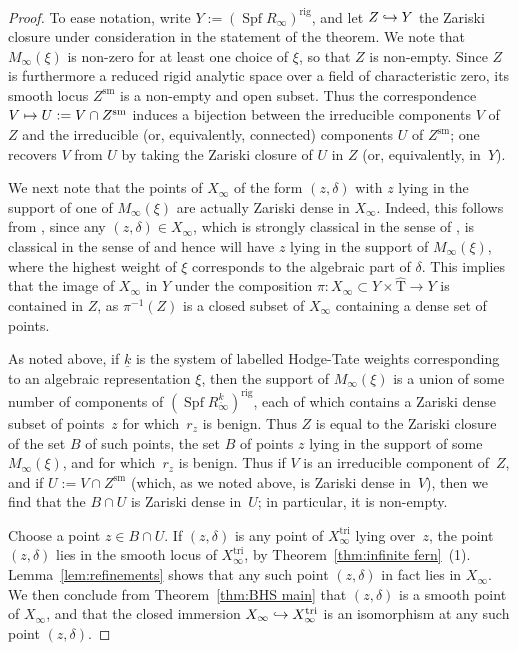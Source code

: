 \documentclass[JEP,XML,SOM,Unicode,NoEqCountersInSection]{cedram}
\newcommand\mto{\mathchoice{\longmapsto}{\mapsto}{\mapsto}{\mapsto}}
\newcommand\hto{\mathrel{\lhook\joinrel\to}}
\theoremstyle{definition}
\DeclareMathOperator{\Spf}{Spf}
\newcommand{\sm}{\mathrm{sm}}
\newcommand\rig{\mathrm{rig}}
\newcommand\tri{\mathrm{tri}}
\begin{document}
\begin{proof}
To ease notation, write $Y := (\Spf R_{\infty})^{\rig}$,
and let $Z \hto Y$ the Zariski closure under consideration in the
statement of the theorem.
We note that $M_{\infty}(\xi)$ is non-zero for at least one choice of $\xi$,
so that $Z$ is non-empty.
Since $Z$ is furthermore a reduced rigid analytic space over a field
of characteristic zero, its smooth locus $Z^{\sm}$ is a non-empty and open subset.
Thus the correspondence $V \mto U := V \cap Z^{\sm}$
induces a bijection between the irreducible components $V$ of $Z$
and the irreducible (or, equivalently, connected) components $U$ of $Z^{\sm}$; one recovers $V$ from
$U$ by taking the Zariski closure of $U$ in $Z$ (or, equivalently, in~$Y$).

We next note that the points of $X_{\infty}$ of the form $(z,\delta)$
with $z$ lying in the support of one of $M_{\infty}(\xi)$
are actually Zariski dense
in $X_{\infty}$. Indeed,
this follows from \cite[Th.\,3.19]{BHS},
since any $(z,\delta)\in X_{\infty}$, which is strongly classical in the sense of \cite[Def.\,3.15]{BHS}, is classical
in the sense of \cite[Def.\,3.17]{BHS} and hence will have $z$ lying in the support of $M_{\infty}(\xi)$, where the highest weight of $\xi$ corresponds to the algebraic part of $\delta$.
This implies that the image of $X_{\infty}$ in $Y$ under the composition $\pi: X_{\infty}\subset Y\times \widehat{\mathrm{T}} \to Y$ is contained in $Z$, as $\pi^{-1}(Z)$ is a closed subset of $X_{\infty}$ containing a dense set of points.

As noted above,
if $\underline{k}$ is the system of labelled
Hodge-Tate weights corresponding to an algebraic representation $\xi$,
then the support of $M_{\infty}(\xi)$
is a union of some number of components of
$(\Spf R_{\infty}^{\underline{k}})^{\rig}$,
each of which contains a Zariski dense subset of points~$z$ for which~$r_z$ is benign. Thus $Z$ is equal to the Zariski
closure of the set $B$ of such points, \ie
the set $B$ of points $z$ lying in the support of some $M_{\infty}(\xi)$,
and for which~$r_z$ is benign.
Thus if $V$ is an irreducible component of~$Z$,
and if $U := V \cap Z^{\sm}$ (which, as we noted above, is Zariski
dense in~$V$),
then we find that the $B \cap U$ is Zariski dense in~$U$; in particular,
it is non-empty.

Choose a point $z \in B \cap U$.
If $(z,\delta)$ is any point of $X^{\tri}_{\infty}$
lying over~$z$,
the point $(z,\delta)$ lies in the smooth
locus of $X^{\tri}_{\infty}$, by Theorem~\ref{thm:infinite fern}~(1).
Lemma~\ref{lem:refinements} shows
that any such point $(z,\delta)$
in fact lies in $X_{\infty}$.
We then conclude from
Theorem~\ref{thm:BHS main}
that $(z,\delta)$ is a smooth point of $X_{\infty}$, and that the closed
immersion
$X_{\infty} \hto X^{\tri}_{\infty}$ is an isomorphism
at any such point $(z,\delta)$.


\end{proof}
\end{document}
